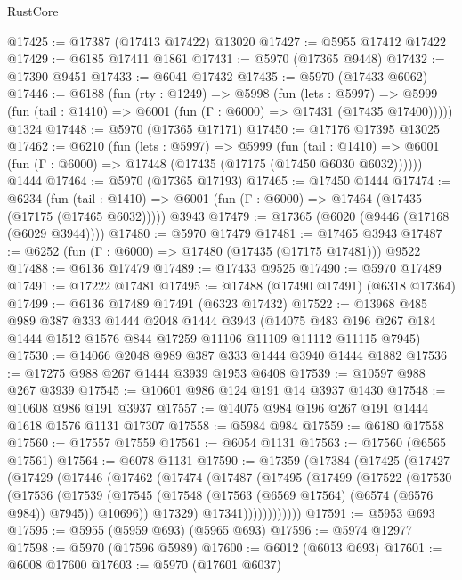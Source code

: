 \begin{lexlean}{RustCore}
\begin{coremodule}
@17425 := @17387 (@17413 @17422) @13020
@17427 := @5955 @17412 @17422
@17429 := @6185 @17411 @1861
@17431 := @5970 (@17365 @9448)
@17432 := @17390 @9451
@17433 := @6041 @17432
@17435 := @5970 (@17433 @6062)
@17446 := @6188
    (fun (rty : @1249) =>
    @5998
      (fun (lets : @5997) =>
      @5999 (fun (tail : @1410) => @6001 (fun (Γ : @6000) => @17431 (@17435 @17400)))))
    @1324
@17448 := @5970 (@17365 @17171)
@17450 := @17176 @17395 @13025
@17462 := @6210
    (fun (lets : @5997) =>
    @5999
      (fun (tail : @1410) =>
      @6001 (fun (Γ : @6000) => @17448 (@17435 (@17175 (@17450 @6030 @6032))))))
    @1444
@17464 := @5970 (@17365 @17193)
@17465 := @17450 @1444
@17474 := @6234
    (fun (tail : @1410) => @6001 (fun (Γ : @6000) => @17464 (@17435 (@17175 (@17465 @6032)))))
    @3943
@17479 := @17365 (@6020 (@9446 (@17168 (@6029 @3944))))
@17480 := @5970 @17479
@17481 := @17465 @3943
@17487 := @6252 (fun (Γ : @6000) => @17480 (@17435 (@17175 @17481))) @9522
@17488 := @6136 @17479
@17489 := @17433 @9525
@17490 := @5970 @17489
@17491 := @17222 @17481
@17495 := @17488 (@17490 @17491) (@6318 @17364)
@17499 := @6136 @17489 @17491 (@6323 @17432)
@17522 := @13968
    @485
    @989
    @387
    @333
    @1444
    @2048
    @1444
    @3943
    (@14075 @483 @196 @267 @184 @1444 @1512 @1576 @844 @17259 @11106 @11109 @11112 @11115 @7945)
@17530 := @14066 @2048 @989 @387 @333 @1444 @3940 @1444 @1882
@17536 := @17275 @988 @267 @1444 @3939 @1953 @6408
@17539 := @10597 @988 @267 @3939
@17545 := @10601 @986 @124 @191 @14 @3937 @1430
@17548 := @10608 @986 @191 @3937
@17557 := @14075 @984 @196 @267 @191 @1444 @1618 @1576 @1131 @17307
@17558 := @5984 @984
@17559 := @6180 @17558
@17560 := @17557 @17559
@17561 := @6054 @1131
@17563 := @17560 (@6565 @17561)
@17564 := @6078 @1131
@17590 := @17359
    (@17384
      (@17425
        (@17427
          (@17429
            (@17446
              (@17462
                (@17474
                  (@17487
                    (@17495
                      (@17499
                        (@17522
                          (@17530
                            (@17536
                              (@17539
                                (@17545
                                  (@17548 (@17563 (@6569 @17564) (@6574 (@6576 @984)) @7945))
                                  @10696))
                              @17329)
                            @17341))))))))))))
@17591 := @5953 @693
@17595 := @5955 (@5959 @693) (@5965 @693)
@17596 := @5974 @12977
@17598 := @5970 (@17596 @5989)
@17600 := @6012 (@6013 @693)
@17601 := @6008 @17600
@17603 := @5970 (@17601 @6037)

\end{coremodule}
\end{lexlean}
